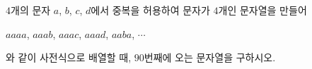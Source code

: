 $4$개의 문자 $a$, $b$, $c$, $d$에서 중복을 허용하여 문자가 $4$개인 문자열을 만들어\par\smallskip\noindent\hspace*{1.5em}$aaaa$, $aaab$, $aaac$, $aaad$, $aaba$, $\cdots$\par\smallskip\noindent 와 같이 사전식으로 배열할 때, $90$번째에 오는 문자열을 구하시오.
